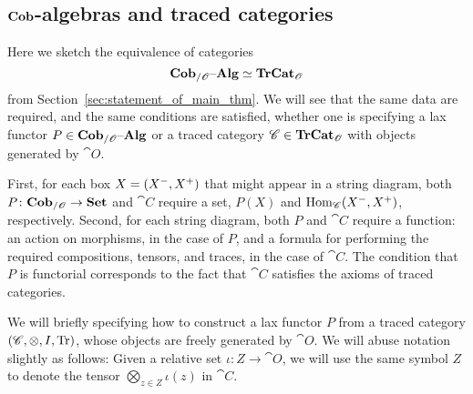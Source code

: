 \documentclass[12pt,oneside,article,draft]{memoir}
\begin{document}
\subsection{$\mathbf{Cob}$-algebras and traced categories}\label{subsec:cobalg_and_trCat}

Here we sketch the equivalence of categories 
$$\mathbf{Cob}_{/\mathscr{O}}{\text \textendash}\mathbf{Alg}\simeq\mathbf{TrCat}_{\mathscr{O}}$$
from Section~\ref{sec:statement_of_main_thm}. We will see that the same data are required, and the same conditions are
satisfied, whether one is specifying a lax functor $P\in\mathbf{Cob}_{/\mathscr{O}}{\text \textendash}\mathbf{Alg}$ or a traced category
$\mathscr{C}\in\mathbf{TrCat}_{\mathscr{O}}$ with objects generated by $\cat{O}$. 

First, for each box $X=(X^-,X^+)$ that might appear in a string diagram, both $P\colon\mathbf{Cob}_{/\mathscr{O}}\to\mathbf{Set}$ and
$\cat{C}$ require a set, $P(X)$ and $\operatorname{Hom}_{\mathscr{C}}(X^-,X^+)$, respectively.
Second, for each string diagram, both $P$ and $\cat{C}$ require a function: an action on morphisms,
in the case of $P$, and a formula for performing the required compositions, tensors, and traces, in
the case of $\cat{C}$. The condition that $P$ is functorial corresponds to the fact that $\cat{C}$
satisfies the axioms of traced categories. 

We will briefly specifying how to construct a lax functor $P$ from a traced category $(\mathscr{C},\otimes,I,\operatorname{Tr})$, whose objects are freely generated by $\cat{O}$. We will abuse notation slightly as follows: Given a relative set
$\iota\colon Z\to\cat{O}$, we will use the same symbol $Z$ to denote
the tensor $\bigotimes_{z\in Z}\iota(z)$ in $\cat{C}$. 
\end{document}

